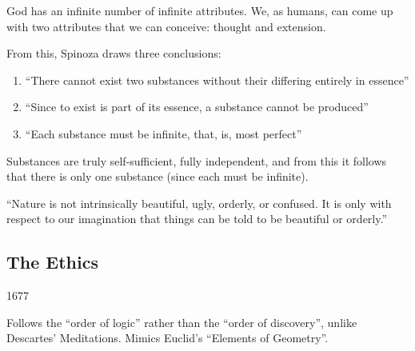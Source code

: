 \documentclass{article}
\begin{document}
    \begin{spacing}{1.2}
    \newpage
        God has an infinite number of infinite attributes.
        We, as humans, can come up with two attributes that we can conceive: thought and extension.

        From this, Spinoza draws three conclusions: 
        \begin{enumerate}
            \item ``There cannot exist two substances without their differing entirely in essence''
            \item ``Since to exist is part of its essence, a substance cannot be produced''
            \item ``Each substance must be infinite, that, is, most perfect''
        \end{enumerate}
        Substances are truly self-sufficient, fully independent, and from this it follows that there is only one substance (since each must be infinite).

        ``Nature is not intrinsically beautiful, ugly, orderly, or confused. It is only with respect to our imagination that things can be told to be beautiful or orderly.''

        \subsection*{The Ethics}
        \begin{flushright}
            1677
        \end{flushright}
        Follows the ``order of logic'' rather than the ``order of discovery'', unlike Descartes' Meditations. Mimics Euclid's ``Elements of Geometry''.


\end{spacing}
\end{document}
